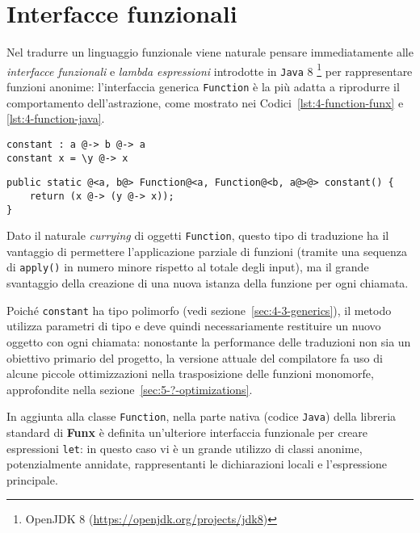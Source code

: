 \section{Interfacce funzionali}
\label{sec:4-1-functional-interfaces}

Nel tradurre un linguaggio funzionale viene naturale pensare immediatamente alle \textit{interfacce funzionali} e \textit{lambda espressioni}
introdotte in \texttt{Java} 8%
\footnote{OpenJDK 8 (\url{https://openjdk.org/projects/jdk8})}
per rappresentare funzioni anonime: l'interfaccia generica \texttt{Function} è la più adatta a riprodurre
il comportamento dell'astrazione, come mostrato nei Codici~\ref{lst:4-function-funx} e \ref{lst:4-function-java}.

\vspace{4mm}
\begin{lstlisting}[caption={Semplice funzione in \textbf{Funx}}, style=funxCode, label={lst:4-function-funx}]
constant : a @-> b @-> a
constant x = \y @-> x
\end{lstlisting}
\vspace{4mm}
\begin{lstlisting}[caption={Corrispondente metodo in \texttt{Java}}, style=javaCode, label={lst:4-function-java}]
public static @<a, b@> Function@<a, Function@<b, a@>@> constant() {
    return (x @-> (y @-> x));
}
\end{lstlisting}
\vspace{4mm}

\noindent Dato il naturale \textit{currying} di oggetti \texttt{Function}, questo tipo di traduzione ha il vantaggio
di permettere l'applicazione parziale di funzioni (tramite una sequenza di \texttt{apply()} in numero minore rispetto al totale degli input),
ma il grande svantaggio della creazione di una nuova istanza della funzione per ogni chiamata.

Poiché \texttt{constant} ha tipo polimorfo (vedi sezione~\ref{sec:4-3-generics}), il metodo utilizza parametri di tipo
e deve quindi necessariamente restituire un nuovo oggetto con ogni chiamata:
nonostante la performance delle traduzioni non sia un obiettivo primario del progetto, la versione attuale
del compilatore fa uso di alcune piccole ottimizzazioni nella trasposizione delle funzioni monomorfe,
approfondite nella sezione~\ref{sec:5-?-optimizations}.

\newpage

\noindent In aggiunta alla classe \texttt{Function}, nella parte nativa (codice \texttt{Java}) della libreria standard
di \textbf{Funx} è definita un'ulteriore interfaccia funzionale per creare espressioni \texttt{let}:
in questo caso vi è un grande utilizzo di classi anonime, potenzialmente annidate,
rappresentanti le dichiarazioni locali e l'espressione principale.

